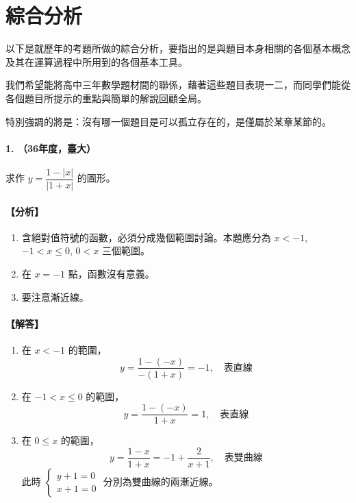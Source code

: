 \section{綜合分析}\label{sec:b6s-ch4}\label{sec:b6s-4}

以下是就歷年的考題所做的綜合分析，要指出的是與題目本身相關的各個基本概念及其在運算過程中所用到的各個基本工具。

我們希望能將高中三年數學題材間的聯係，藉著這些題目表現一二，而同學們能從各個題目所提示的重點與簡單的解說回顧全局。

特別強調的將是：沒有哪一個題目是可以孤立存在的，是僅屬於某章某節的。


\paragraph{1. （36年度，臺大）}
求作 $y = \dfrac{1-|x|}{|1+x|}$ 的圖形。

\paragraph{【分析】}
\begin{enumerate}[label=(\arabic*), leftmargin=2em]
  \item 含絕對值符號的函數，必須分成幾個範圍討論。本題應分為 $x<-1$, $-1<x\le 0$, $0<x$ 三個範圍。
  \item 在 $x=-1$ 點，函數沒有意義。
  \item 要注意漸近線。
\end{enumerate}

\paragraph{【解答】}
\begin{enumerate}[label=(\arabic*), leftmargin=2em]
  \item 在 $x<-1$ 的範圍，
  \[ y = \dfrac{1-(-x)}{-(1+x)} = -1, \quad \text{表直線} \]
  \item 在 $-1<x\le 0$ 的範圍，
  \[ y = \dfrac{1-(-x)}{1+x} = 1, \quad \text{表直線} \]
  \item 在 $0\le x$ 的範圍，
  \[ y = \dfrac{1-x}{1+x} = -1 + \dfrac{2}{x+1}, \quad \text{表雙曲線} \]
  此時 $\begin{cases} y+1=0 \\ x+1=0 \end{cases}$ 分別為雙曲線的兩漸近線。
\end{enumerate}

